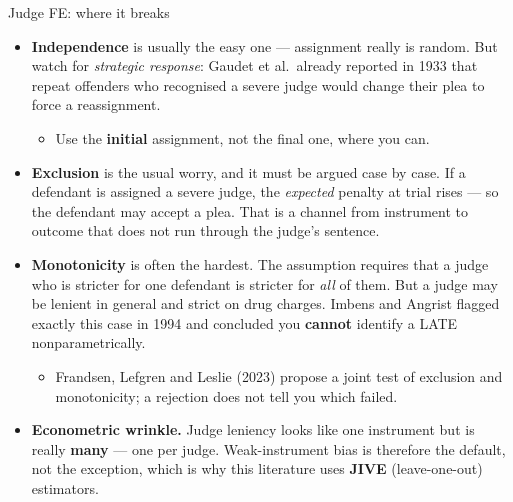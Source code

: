 \documentclass[
  11pt,
  ignorenonframetext,
  aspectratio=169,
]{beamer}
\providecommand{\tightlist}{%
  \setlength{\itemsep}{0pt}\setlength{\parskip}{0pt}}
\begin{document}
\begin{frame}{Judge FE: where it breaks}
\protect{}\label{judge-fe-where-it-breaks}
\begin{itemize}
\tightlist
\item
  \textbf{Independence} is usually the easy one --- assignment really is
  random. But watch for \emph{strategic response}: Gaudet et al.~already
  reported in 1933 that repeat offenders who recognised a severe judge
  would change their plea to force a reassignment.

  \begin{itemize}
  \tightlist
  \item
    Use the \textbf{initial} assignment, not the final one, where you
    can.
  \end{itemize}
\item
  \textbf{Exclusion} is the usual worry, and it must be argued case by
  case. If a defendant is assigned a severe judge, the \emph{expected}
  penalty at trial rises --- so the defendant may accept a plea. That is
  a channel from instrument to outcome that does not run through the
  judge's sentence.
\item
  \textbf{Monotonicity} is often the hardest. The assumption requires
  that a judge who is stricter for one defendant is stricter for
  \emph{all} of them. But a judge may be lenient in general and strict
  on drug charges. Imbens and Angrist flagged exactly this case in 1994
  and concluded you \textbf{cannot} identify a LATE nonparametrically.

  \begin{itemize}
  \tightlist
  \item
    Frandsen, Lefgren and Leslie (2023) propose a joint test of
    exclusion and monotonicity; a rejection does not tell you which
    failed.
  \end{itemize}
\item
  \textbf{Econometric wrinkle.} Judge leniency looks like one instrument
  but is really \textbf{many} --- one per judge. Weak-instrument bias is
  therefore the default, not the exception, which is why this literature
  uses \textbf{JIVE} (leave-one-out) estimators.
\end{itemize}
\end{frame}
\end{document}
